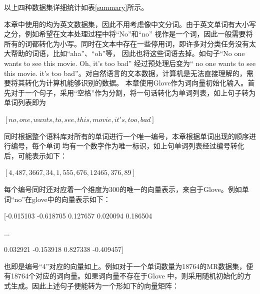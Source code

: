 以上四种数据集详细统计如表\ref{summary}所示。

\begin{table}[htb]
	\centering
	\caption{数据集数据统计}
\end{table}

本章中使用的均为英文数据集，因此不用考虑像中文分词。由于英文单词有大小写之分，例如希望在文本处理过程中将“No”和“no”
视作是一个词，因此一般需要将所有的词都转化为小写。同时在文本中存在一些停用词，即许多对分类任务没有太大帮助的词语，比如“aha”、“oh”等，
因此也将这些词语去掉。如句子“No one wants to see this movie. Oh, it's too bad” 经过预处理后变为“
no one wants to see this movie. it's too bad”。对自然语言的文本数据，计算机是无法直接理解的，需要将其转化为计算机能够识别的数据。
本章使用Glove作为词向量初始化输入。首先对于一个句子，采用“空格”作为分割，将一句话转化为单词列表，如上句子转为单词列表即为
\centerline{$[no,one,wants,to,see,this,movie,it's,too,bad]$}

同时根据整个语料库对所有的单词进行一个唯一编号，本章根据单词出现的顺序进行编号，每个单词
均有一个数字作为唯一标识，如上句单词列表经过编号转化后，可能表示如下：

\centerline{$[4,487,3667,34,1,555,676,12465,376,89]$}

每个编号同时还对应着一个维度为300的唯一的向量表示，来自于Glove。例如单词“no”在glove中的向量表示如下：


\centerline{[-0.015103  -0.618705  0.127657  0.020094  0.186504 }

\centerline{...}

\centerline{0.032921  -0.153918  0.827338  -0.409457]}

也即是编号“4”对应的向量如上。例如对于一个单词数量为18764的MR数据集，便有18764个对应的词向量。如果词向量不存在于Glove
中，则采用随机初始化的方式生成。因此上述句子便能转为一个形如下的向量矩阵：

